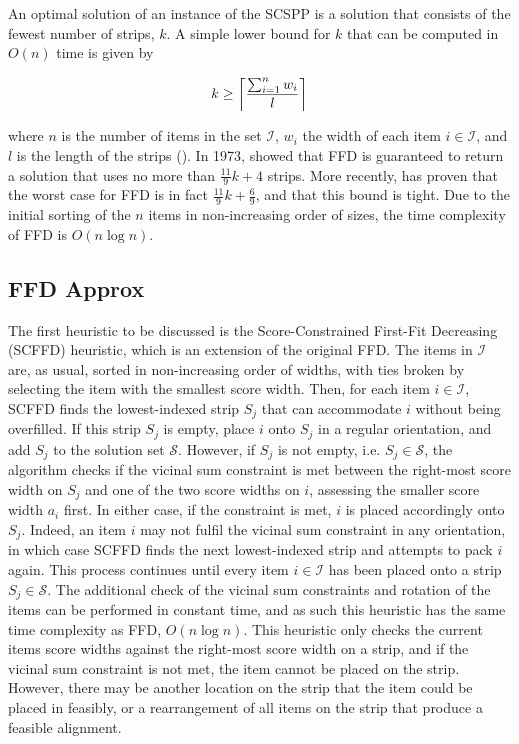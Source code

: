 \documentclass[oribibl]{llncs}
\begin{document}
An optimal solution of an instance of the SCSPP is a solution that consists of the fewest number of strips, $k$. A simple lower bound for $k$ that can be computed in $O(n)$ time is given by

\begin{equation}
	\label{eqn:lowerbound}
	k \geq \ceil*{\frac{\sum_{i=1}^{n}w_i}{l}}
\end{equation}

where $n$ is the number of items in the set $\mathcal{I}$, $w_i$ the width of each item $i \in \mathcal{I}$, and $l$ is the length of the strips (\citealp{martello1990b}). In 1973, \citeauthor{johnson1973} showed that FFD is guaranteed to return a solution that uses no more than $\frac{11}{9}k + 4$ strips. More recently, \cite{dosa2007} has proven that the worst case for FFD is in fact $\frac{11}{9}k + \frac{6}{9}$, and that this bound is tight. Due to the initial sorting of the $n$ items in non-increasing order of sizes, the time complexity of FFD is $O(n\log n)$.


\subsection{FFD Approx}
\label{sec:ffdapprox}
The first heuristic to be discussed is the Score-Constrained First-Fit Decreasing (SCFFD) heuristic, which is an extension of the original FFD. The items in $\mathcal{I}$ are, as usual, sorted in non-increasing order of widths, with ties broken by selecting the item with the smallest score width. Then, for each item $i \in \mathcal{I}$, SCFFD finds the lowest-indexed strip $S_j$ that can accommodate $i$ without being overfilled. If this strip $S_j$ is empty, place $i$ onto $S_j$ in a regular orientation, and add $S_j$ to the solution set $\mathcal{S}$. However, if $S_j$ is not empty, i.e. $S_j \in \mathcal{S}$, the algorithm checks if the vicinal sum constraint is met between the right-most score width on $S_j$ and one of the two score widths on $i$, assessing the smaller score width $a_i$ first. In either case, if the constraint is met, $i$ is placed accordingly onto $S_j$. Indeed, an item $i$ may not fulfil the vicinal sum constraint in any orientation, in which case SCFFD finds the next lowest-indexed strip and attempts to pack $i$ again. This process continues until every item $i \in \mathcal{I}$ has been placed onto a strip $S_j \in \mathcal{S}$. The additional check of the vicinal sum constraints and rotation of the items can be performed in constant time, and as such this heuristic has the same time complexity as FFD, $O(n \log n)$. This heuristic only checks the current items score widths against the right-most score width on a strip, and if the vicinal sum constraint is not met, the item cannot be placed on the strip. However, there may be another location on the strip that the item could be placed in feasibly, or a rearrangement of all items on the strip that produce a feasible alignment.
\end{document}
